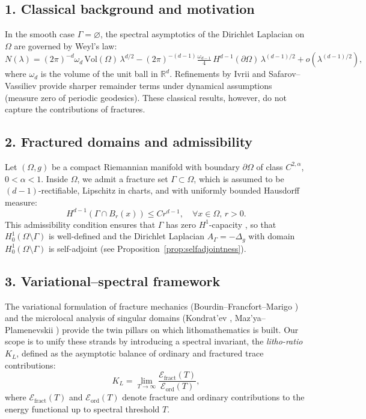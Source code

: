 \subsection*{1. Classical background and motivation}
In the smooth case $\Gamma = \varnothing$, the spectral asymptotics of the Dirichlet
Laplacian on $\Omega$ are governed by Weyl's law:
\[
N(\lambda) = (2\pi)^{-d} \omega_d \, \mathrm{Vol}(\Omega) \, \lambda^{d/2}
  - (2\pi)^{-(d-1)} \tfrac{\omega_{d-1}}{4} \, H^{d-1}(\partial\Omega) \, \lambda^{(d-1)/2}
  + o(\lambda^{(d-1)/2}),
\]
where $\omega_d$ is the volume of the unit ball in $\mathbb{R}^d$. Refinements by
Ivrii \cite{Ivrii1980, Ivrii1998} and Safarov--Vassiliev \cite{SafarovVassiliev1996}
provide sharper remainder terms under dynamical assumptions (measure zero of periodic
geodesics). These classical results, however, do not capture the contributions of
fractures.

\subsection*{2. Fractured domains and admissibility}
Let $(\Omega,g)$ be a compact Riemannian manifold with boundary $\partial\Omega$ of
class $C^{2,\alpha}$, $0<\alpha<1$. Inside $\Omega$, we admit a fracture set
$\Gamma \subset \Omega$, which is assumed to be $(d-1)$-rectifiable, Lipschitz in
charts, and with uniformly bounded Hausdorff measure:
\[
H^{d-1}(\Gamma \cap B_r(x)) \leq C r^{d-1}, \quad \forall x\in\Omega, \, r>0.
\]
This admissibility condition ensures that $\Gamma$ has zero $H^1$-capacity
\cite{MazyaPlamenevskii1980}, so that $H^1_0(\Omega\setminus\Gamma)$ is well-defined
and the Dirichlet Laplacian $A_\Gamma = -\Delta_g$ with domain $H^1_0(\Omega\setminus\Gamma)$
is self-adjoint (see Proposition~\ref{prop:selfadjointness}).

\subsection*{3. Variational--spectral framework}
The variational formulation of fracture mechanics (Bourdin--Francfort--Marigo
\cite{BourdinFrancfortMarigo2008}) and the microlocal analysis of singular domains
(Kondrat'ev \cite{Kondratev1967}, Maz'ya--Plamenevskii \cite{MazyaPlamenevskii1980})
provide the twin pillars on which lithomathematics is built. Our scope is to unify
these strands by introducing a spectral invariant, the \emph{litho-ratio} $K_L$,
defined as the asymptotic balance of ordinary and fractured trace contributions:
\[
K_L = \lim_{T\to\infty} \frac{\mathcal{E}_{\text{fract}}(T)}{\mathcal{E}_{\text{ord}}(T)},
\]
where $\mathcal{E}_{\text{fract}}(T)$ and $\mathcal{E}_{\text{ord}}(T)$ denote
fracture and ordinary contributions to the energy functional up to spectral
threshold $T$.

